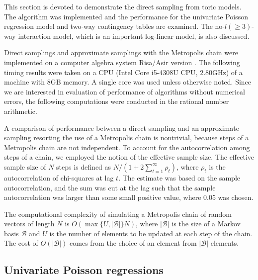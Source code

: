 \documentclass[a4paper,12pt]{article}
\theoremstyle{plain}
\theoremstyle{remark}
\begin{document}
This section is devoted to demonstrate the direct sampling from
toric models. The algorithm was implemented and the performance
for the univariate Poisson regression model and two-way contingency
tables are examined. The no-$l(\ge 3)$-way interaction model,
which is an important log-linear model, is also discussed.

Direct samplings and approximate samplings with the Metropolis chain
were implemented on a computer algebra system Risa/Asir version
\cite{NT92}. The following timing results were taken
on a CPU (Intel Core i5-4308U CPU, 2.80GHz) of a machine with
8GB memory. A single core was used unless otherwise noted.
Since we are interested in evaluation of performance
of algorithms without numerical errors, the following
computations were conducted in the rational number arithmetic.

A comparison of performance between a direct sampling and
an approximate sampling resorting the use of a Metropolis
chain is nontrivial, because steps of a Metropolis chain are
not independent. To account for the autocorrelation among
steps of a chain, we employed the notion of the effective
sample size. The effective sample size of $N$
steps is defined as $N/(1+2\sum^\infty_{t=1}\rho_t)$, where
$\rho_t$ is the autocorrelation of chi-squares at lag $t$.
The estimate was based on the sample autocorrelation,
and the sum was cut at the lag such that the sample
autocorrelation was larger than some small positive value,
where 0.05 was chosen.

The computational complexity of simulating
a Metropolis chain of random vectors of length $N$ is
$O(\max\{U,|\mathcal{B}|\}N)$, where $|\mathcal{B}|$ is
the size of a Markov basis $\mathcal{B}$ and $U$ is the number
of elements to be updated at each step of the chain.
The cost of $O(|\mathcal{B}|)$ comes from the choice of
an element from $|\mathcal{B}|$ elements.

\subsection{Univariate Poisson regressions}
\end{document}

